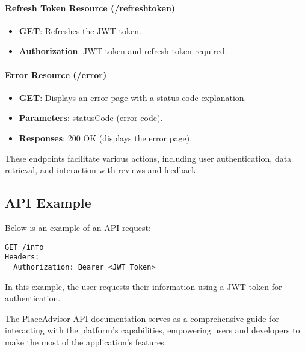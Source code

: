\documentclass[../main.tex]{subfiles}
\begin{document}
\paragraph{Refresh Token Resource (/refreshtoken)}

\begin{itemize}
  \item \textbf{GET}: Refreshes the JWT token.
  \item \textbf{Authorization}: JWT token and refresh token required.
\end{itemize}

\paragraph{Error Resource (/error)}

\begin{itemize}
  \item \textbf{GET}: Displays an error page with a status code explanation.
  \item \textbf{Parameters}: statusCode (error code).
  \item \textbf{Responses}: 200 OK (displays the error page).
\end{itemize}

These endpoints facilitate various actions, including user authentication, data retrieval, and interaction with reviews and feedback.



\subsection{API Example}

Below is an example of an API request:

\begin{lstlisting}
GET /info
Headers:
  Authorization: Bearer <JWT Token>
\end{lstlisting}
In this example, the user requests their information using a JWT token for authentication.

The PlaceAdvisor API documentation serves as a comprehensive guide for interacting with the platform's capabilities, empowering users and developers to make the most of the application's features.
\end{document}
